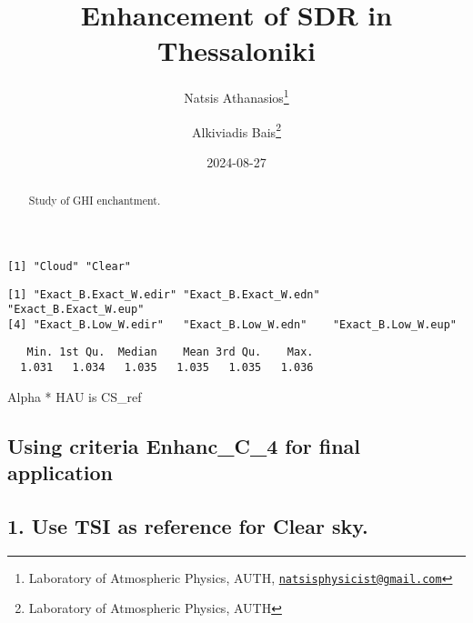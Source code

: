 \documentclass[
  10pt,
  a4paper,oneside]{article}
\title{Enhancement of SDR in Thessaloniki}
\author{Natsis Athanasios\footnote{Laboratory of Atmospheric Physics, AUTH, \href{mailto:natsisphysicist@gmail.com}{\nolinkurl{natsisphysicist@gmail.com}}} \and Alkiviadis Bais\footnote{Laboratory of Atmospheric Physics, AUTH}}
\date{2024-08-27}
\begin{document}
\maketitle
\begin{abstract}
Study of GHI enchantment.
\end{abstract}

{
\hypersetup{linkcolor=}
\setcounter{tocdepth}{4}
\tableofcontents
}
\begin{verbatim}
[1] "Cloud" "Clear"
\end{verbatim}

\begin{verbatim}
[1] "Exact_B.Exact_W.edir" "Exact_B.Exact_W.edn"  "Exact_B.Exact_W.eup" 
[4] "Exact_B.Low_W.edir"   "Exact_B.Low_W.edn"    "Exact_B.Low_W.eup"   
\end{verbatim}

\begin{verbatim}
   Min. 1st Qu.  Median    Mean 3rd Qu.    Max. 
  1.031   1.034   1.035   1.035   1.035   1.036 
\end{verbatim}

Alpha * HAU is CS\_ref

\hypertarget{using-criteria-enhanc_c_4-for-final-application}{%
\subsection{\texorpdfstring{Using criteria \textbf{Enhanc\_C\_4} for final application}{Using criteria Enhanc\_C\_4 for final application}}\label{using-criteria-enhanc_c_4-for-final-application}}

\hypertarget{use-tsi-as-reference-for-clear-sky.}{%
\subsection{1. Use TSI as reference for Clear sky.}\label{use-tsi-as-reference-for-clear-sky.}}
\end{document}
